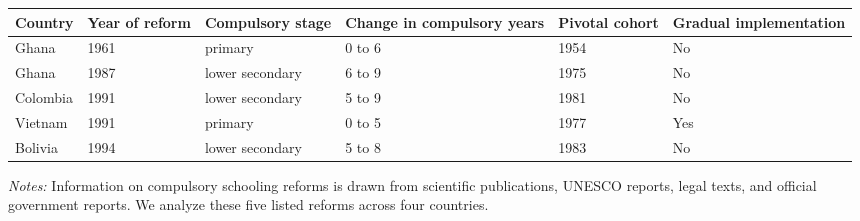 \begin{threeparttable}
	\begin{tabular}{l p{1.3cm} p{2.5cm} p{2.2cm} p{1.2cm} p{2cm}}
		\hline\hline
		\textbf{Country} & \textbf{Year of reform} & \textbf{Compulsory stage} & \textbf{Change in compulsory years} & \textbf{Pivotal cohort} & \textbf{Gradual implementation} \\
		\hline
		Ghana & 1961  & primary & 0 to 6 & 1954 & No \\
		Ghana & 1987 & lower secondary & 6 to 9 & 1975 & No \\
		Colombia & 1991 & lower secondary & 5 to 9 & 1981 & No \\
		Vietnam & 1991 & primary & 0 to 5 & 1977 & Yes \\
		Bolivia & 1994 & lower secondary & 5 to 8 & 1983 & No \\
		\hline\hline
	\end{tabular}
	\begin{tablenotes}
		\footnotesize
		\item \textit{Notes:} Information on compulsory schooling reforms is drawn from scientific publications, UNESCO reports, legal texts, and official government reports. We analyze these five listed reforms across four countries.
	\end{tablenotes}
\end{threeparttable}
